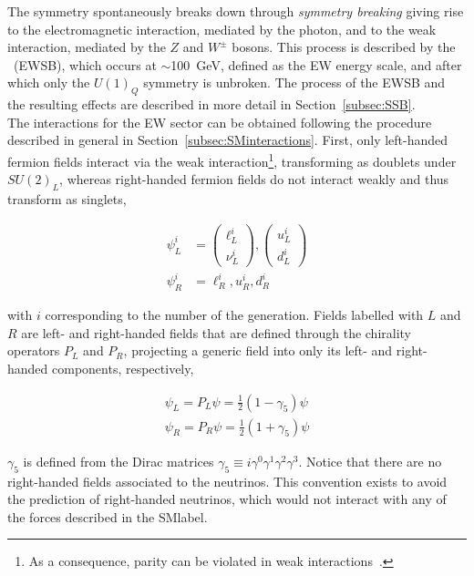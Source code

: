 The symmetry spontaneously breaks down through \textit{symmetry breaking} giving rise to the electromagnetic interaction,
mediated by the photon, and to the weak interaction, mediated by the $Z$ and $W^\pm$ bosons.
This process is described by the \textit{}~(\acrshort{EWSB}), which occurs at $\sim$100~GeV, defined as the \acrshort{EW} energy scale, and after which only the $U(1)_Q$ symmetry is unbroken. The process of the \acrshort{EWSB} and the resulting effects are described in
more detail in Section~\ref{subsec:SSB}.\\

The interactions for the \acrshort{EW} sector can be obtained following the procedure described in general in Section~\ref{subsec:SMinteractions}. First, only left-handed fermion fields interact via the weak
interaction\footnote{As a consequence, parity can be violated in weak interactions~\cite{Lee,Wu}.},
transforming as doublets under $SU(2)_L$, whereas right-handed fermion fields do not interact weakly and thus transform as singlets,

\begin{equation}
\begin{split}
    \psi_L^i &= \begin{pmatrix}\ell^i_L\\ \nu^i_L \end{pmatrix}, \begin{pmatrix} u^i_L \\ d^i_L \end{pmatrix}\\
    \psi_R^i &= \ell^i_R, u^i_R, d^i_R
\end{split}
\end{equation}

with $i$ corresponding to the number of the generation. Fields labelled with $L$ and $R$ are left- and right-handed fields that are defined through the chirality operators $P_L$ and $P_R$, projecting a generic field into only its left- and right-handed components, respectively,

\begin{equation}
    \begin{split}
        \psi_L = P_L\psi = \frac{1}{2}(1-\gamma_5)\psi\\
        \psi_R = P_R\psi = \frac{1}{2}(1+\gamma_5)\psi
    \end{split}
\end{equation}

$\gamma_5$ is defined from the Dirac matrices $\gamma_5\equiv i\gamma^0\gamma^1\gamma^2\gamma^3$. Notice that there are no right-handed fields associated to the neutrinos. This convention exists to avoid the prediction of right-handed neutrinos, which would not interact with any of the forces described in the \acrshort{SMlabel}.\\

